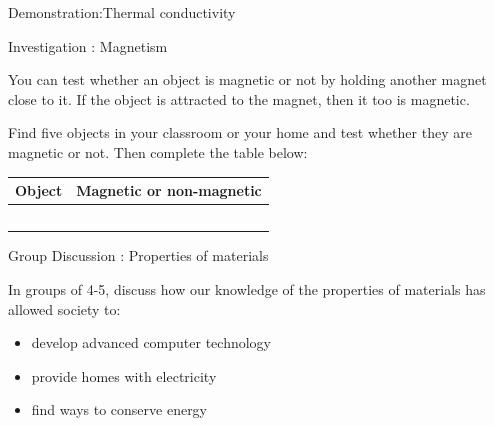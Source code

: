 \begin{gexperiment}{Demonstration:Thermal conductivity}
\begin{gexperiment}{Investigation : Magnetism}
{            \nopagebreak
      \label{m38706*id67220}You can test whether an object is magnetic or not by holding another magnet close to it. If the object is attracted to the magnet, then it too is magnetic.\par 
      \label{m38706*id67227}Find five objects in your classroom or your home and test whether they are magnetic or not. Then complete the table below:\par 
          \begin{table}[H]
        \begin{center}
      \label{m38706*id67234}
    \noindent
      \begin{tabular}{|l|l|}\hline
                \textbf{Object}
               &
                \textbf{Magnetic or non-magnetic} \\ \hline
         & \\ \hline
         & \\ \hline
         & \\ \hline
         & \\ \hline
         & \\ \hline
    \end{tabular}
      \end{center}
\end{table}}
\end{gexperiment}
    \par
\label{m38706*secfhsst!!!underscore!!!id616}
            \begin{groupdiscussion}{Group Discussion : Properties of materials}{
            \nopagebreak
      \label{m38706*id67392}In groups of 4-5, discuss how our knowledge of the properties of materials has allowed society to:\par 
      \label{m38706*id67398}\begin{itemize}[noitemsep]
            \label{m38706*uid111}\item develop advanced computer technology
\label{m38706*uid112}\item provide homes with electricity
\label{m38706*uid113}\item find ways to conserve energy

\end{itemize}}
\end{groupdiscussion}
\end{gexperiment}

